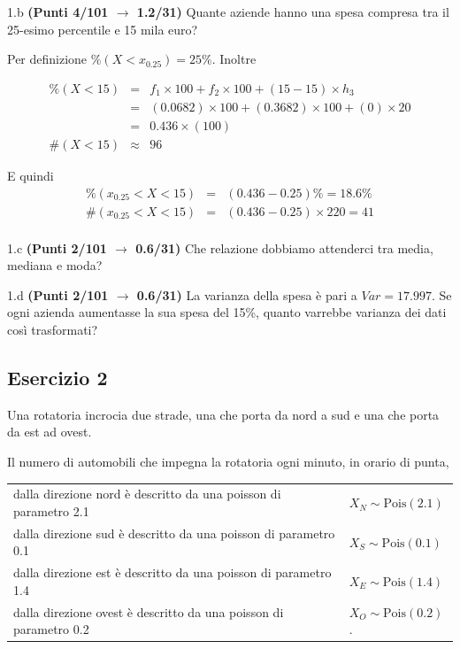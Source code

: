 \documentclass[
  11pt,
]{book}
\theoremstyle{mytheoremstyle}
\theoremstyle{mydefstyle}
\newenvironment{sol}
  {
  \begin{tcolorbox}[enhanced,breakable,arc=0.1mm,boxrule=1pt,colback=white,colframe=iblue,
  title=\bf \fontfamily{lmss}\selectfont \hspace{.5 cm} Soluzione,drop fuzzy shadow]

}{
\end{tcolorbox}
  }
\begin{document}
1.b \textbf{(Punti 4/101 \(\rightarrow\) 1.2/31)} Quante aziende hanno una spesa compresa tra il 25-esimo percentile e 15 mila euro?

\begin{sol}
Per definizione \(\%(X<x_{ 0.25 })= 25 \%\). Inoltre

\begin{eqnarray*}
   \%(X< 15 ) &=&  f_{ 1 }\times 100+f_{ 2 }\times 100 +( 15 - 15 )\times h_{ 3 } \\
                &=&  ( 0.0682 )\times 100+( 0.3682 )\times 100 +( 0 )\times  20  \\
                &=&  0.436 \times(100) \\
\#(X< 15 )    &\approx& 96 
\end{eqnarray*}

E quindi
\begin{eqnarray*}
   \%( x_{0.25} < X < 15 ) &=& ( 0.436 - 0.25 )\%= 18.6 \% \\
   \#( x_{0.25} < X < 15 ) &=& ( 0.436 - 0.25 )\times  220 = 41  \\
\end{eqnarray*}

\end{sol}

1.c \textbf{(Punti 2/101 \(\rightarrow\) 0.6/31)} Che relazione dobbiamo attenderci tra media, mediana e moda?

1.d \textbf{(Punti 2/101 \(\rightarrow\) 0.6/31)} La varianza della spesa è pari a \(Var=17.997\).
Se ogni azienda aumentasse la sua spesa del 15\%, quanto varrebbe varianza dei dati così trasformati?

\subsection{Esercizio 2}\label{esercizio-2-14}

Una rotatoria incrocia due strade, una che porta da nord a sud e una che porta da est ad ovest.

Il numero di automobili che impegna la rotatoria ogni minuto, in orario di punta,

\begin{longtable}[]{@{}
  >{\raggedright\arraybackslash}p{}
  >{\raggedright\arraybackslash}p{}@{}}
\toprule\noalign{}
\endhead
\bottomrule\noalign{}
\endlastfoot
dalla direzione nord è descritto da una poisson di parametro 2.1 & \(X_N\sim\text{Pois}(2.1)\) \\
dalla direzione sud è descritto da una poisson di parametro 0.1 & \(X_S\sim\text{Pois}(0.1)\) \\
dalla direzione est è descritto da una poisson di parametro 1.4 & \(X_E\sim\text{Pois}(1.4)\) \\
dalla direzione ovest è descritto da una poisson di parametro 0.2 & \(X_O\sim\text{Pois}(0.2)\). \\
\end{longtable}
\end{document}
